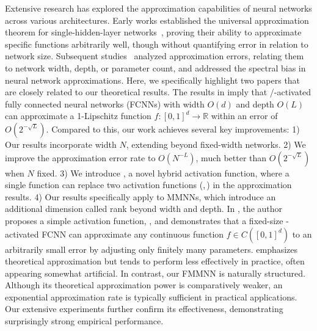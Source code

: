 \documentclass[11pt,a4paper]{article}
\begin{document}
Extensive research has explored the approximation capabilities of neural networks across various architectures. Early works established the universal approximation theorem for single-hidden-layer networks~\cite{Cybenko1989ApproximationBS,HORNIK1991251,HORNIK1989359}, proving their ability to approximate specific functions arbitrarily well, though without quantifying error in relation to network size. Subsequent studies~\cite{yarotsky18a,yarotsky2017,doi:10.1137/18M118709X,ZHOU2019,10.3389/fams.2018.00014,2019arXiv190501208G,2019arXiv190207896G,MO,shijun:NonlineArpprox,shijun:Characterized:by:Numer:Neurons,shijun:smooth:functions,shijun:arbitrary:error:with:fixed:size,shijun:thesis,shijun:intrinsic:parameters,shijun:2023:beyond:ReLU:to:diverse:actfun,yarotsky:2019:06, fang2024addressing,shijun:2023:beyond:ReLU:to:diverse:actfun} analyzed approximation errors, relating them to network width, depth, or parameter count, and addressed the spectral bias in neural network approximations. 
Here, we specifically highlight two papers \cite{shijun:arbitrary:error:with:fixed:size, yarotsky:2019:06} that are closely related to our theoretical results.
 The results in \cite{yarotsky:2019:06} imply that \ReLU/\sine-activated fully connected neural networks (FCNNs) with width $O(d)$ and depth $O(L)$ can approximate a 1-Lipschitz function $f:[0,1]^d\to\mathbb{R}$ within an error of $O(2^{-\sqrt{L}})$. Compared to this, our work achieves several key improvements: 
1) Our results incorporate width $N$, extending beyond fixed-width networks.  
2) We improve the approximation error rate to $O(N^{-L})$, much better than $O(2^{-\sqrt{L}})$ when $N$ fixed.  
3) We introduce \SinTU{}, a novel hybrid activation function, where a single \SinTU{} function can replace two activation functions (\ReLU,\,\sine) in the approximation results.  
4) Our results specifically apply to MMNNs, which introduce an additional dimension called rank beyond width and depth.  
In \cite{shijun:arbitrary:error:with:fixed:size}, the author proposes a simple activation function, \EUAF, and demonstrates that a fixed-size \EUAF-activated FCNN can approximate any continuous function $f\in C([0,1]^d)$ to an arbitrarily small error by adjusting only finitely many parameters. 
\EUAF{} emphasizes theoretical approximation but tends to perform less effectively in practice, often appearing somewhat artificial. 
In contrast, our FMMNN is naturally structured. Although its theoretical approximation power is comparatively weaker, an exponential approximation rate is typically sufficient in practical applications. Our extensive experiments further confirm its effectiveness, demonstrating surprisingly strong empirical performance.
\end{document}
